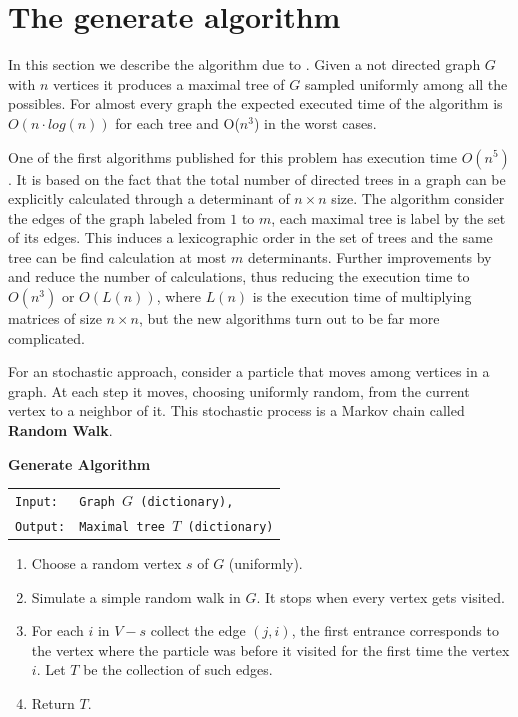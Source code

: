 
\chapter{The generate algorithm} %

\label{AppendixA} %


In this section we describe the algorithm due to \cite[Broder]{Broder89}. Given a not directed graph $G$ with $n$ vertices it produces a maximal tree of $G$ sampled uniformly among all the possibles. For almost every graph the expected executed time of the algorithm is $O(n\cdot log(n) )$ for each tree and O($n^{3}$) in the worst cases. 

One of the first algorithms published for this problem has execution time $O (n^{5})$. It is based on the fact that the total number of directed trees in a graph can be explicitly calculated through a determinant of $n \times n$ size. The algorithm consider the edges of the graph labeled from $1$ to $m$, each maximal tree is label by the set of its edges. This induces a lexicographic order in the set of trees and the same tree can be find calculation at most $m$ determinants. Further improvements by \cite{CDN88} and \cite{CDM88} reduce the number of calculations, thus reducing the execution time to $O(n^3)$ or $O(L(n))$, where $L(n)$ is the execution time of multiplying matrices of size $n\times n$, but the new algorithms turn out to be far more complicated.

For an stochastic approach, consider a particle that moves among vertices in a graph. At each step it moves, choosing uniformly random, from the current vertex to a neighbor of it. This stochastic process is a Markov chain called \textbf{Random Walk}.

\begin{cajita}
\textbf{Generate Algorithm}\hfill \break
\begin{tabular}{ l l }
\texttt{Input:} &  \texttt{Graph $G$ (dictionary),} \\
\texttt{Output:} & \texttt{Maximal tree $T$ (dictionary)} \\
\end{tabular}

\begin{enumerate}
\item Choose a random vertex $s$ of $G$ (uniformly).
\item Simulate a simple random walk in $G$. It stops when every vertex gets visited. 
\item For each $i$ in $V-s$ collect the edge $(j,i)$, the first entrance corresponds to the vertex where the particle was before it visited for the first time the vertex $i$. Let $T$ be the collection of such edges.
\item Return $T$.
\end{enumerate}
\end{cajita}

